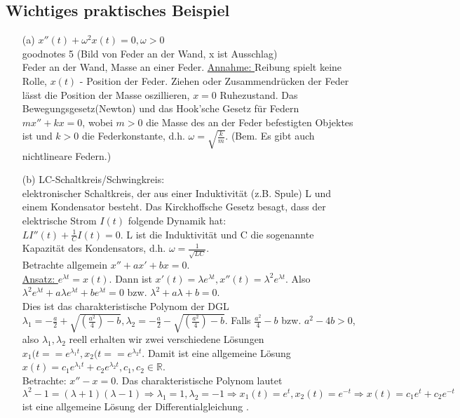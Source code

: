 \documentclass[12pt,a4paper]{article}
\newcommand{\DGL}{Differentialgleichung }
\newcommand{\Lsg}{Lösung }
\begin{document}
\subsection{Wichtiges praktisches Beispiel}
\begin{itemize}
\item[(a)] $x''(t) + \omega^2x(t) = 0, \omega > 0$ \\ goodnotes 5 (Bild von Feder an der Wand, x ist Ausschlag) \\
Feder an der Wand, Masse an einer Feder. \underline{Annahme: } Reibung spielt keine Rolle, $x(t)$ - Position der Feder. Ziehen oder Zusammendrücken der Feder lässt die Position der Masse oszillieren, $x=0$ Ruhezustand. Das Bewegungsgesetz(Newton) und das Hook'sche Gesetz für Federn $mx''+kx = 0$, wobei $m>0$ die Masse des an der Feder befestigten Objektes ist und $k>0$ die Federkonstante, d.h. $\omega = \sqrt{\frac{k}{m}}$. (Bem. Es gibt auch nichtlineare Federn.)
\item[(b)] LC-Schaltkreis/Schwingkreis: \\
elektronischer Schaltkreis, der aus einer Induktivität (z.B. Spule) L und einem Kondensator besteht. Das Kirckhoffsche Gesetz besagt, dass der elektrische Strom $I(t)$ folgende Dynamik hat: \\
$LI''(t) + \frac{1}{C}I(t) = 0$. L ist die Induktivität und C die sogenannte Kapazität des Kondensators, d.h. $\omega = \frac{1}{\sqrt{LC}}$. \\
Betrachte allgemein $x''+ax'+bx=0$. \\
 \underline{Ansatz: } $e^{\lambda t} = x(t)$. Dann ist $x'(t) = \lambda e^{\lambda t}, x''(t) = \lambda^2e^{\lambda t}$. Also $\lambda^2e^{\lambda t}+a \lambda e^{\lambda t} + b e^{\lambda t} = 0$ bzw. $\lambda^2 + a \lambda + b = 0$. \\
Dies ist das charakteristische Polynom der DGL $\lambda_1 = -\frac{a}{2} + \sqrt{(\frac{a^2}{4})-b}, \lambda_2 = -\frac{a}{2} - \sqrt{(\frac{a^2}{4})-b}$. Falls $\frac{a^2}{4}-b$ bzw. $a^2-4b >0$, also $\lambda_1, \lambda_2$ reell erhalten wir zwei verschiedene Lösungen $x_1(t= = e^{\lambda_1 t}, x_2(t= = e^{\lambda_2 t}$. Damit ist eine allgemeine Lösung $x(t) = c_1e^{\lambda_1 t} + c_2 e^{\lambda_2 t}, c_1, c_2 \in \mathbb{R}$. \\
Betrachte: $x''-x=0$. Das charakteristische Polynom lautet $\lambda^2-1=(\lambda+1)(\lambda-1) \Rightarrow \lambda_1 = 1, \lambda_2 = -1 \Rightarrow x_1(t) = e^t, x_2(t) = e^{-t} \Rightarrow x(t) = c_1e^t + c_2e^{-t}$ ist eine allgemeine \Lsg der \DGL. 
\end{itemize}
\end{document}
